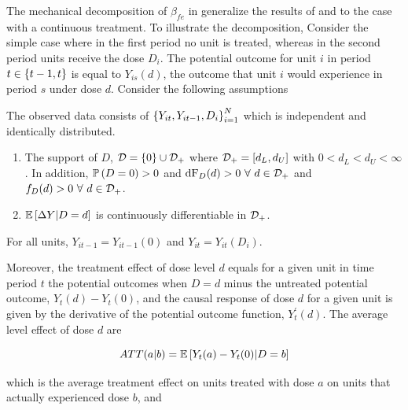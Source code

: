 \documentclass[11pt]{article}
\begin{document}
The mechanical decomposition of $\beta_{fe}$ in \citet{bib:callaway2021} generalize the results of \citet{bib:goodman-bacon2021} and \citet{bib:dechaisemartin2020} to the case with a continuous treatment. To illustrate the decomposition, Consider the simple case where in the first period no unit is treated, whereas in the second period units receive the dose $D_{i}$. The potential outcome for unit $i$ in period $t \in \left\{ t-1, t \right\}$ is equal to $Y_{is}(d)$, the outcome that unit $i$ would experience in period $s$ under dose $d$. Consider the following assumptions
\begin{assumption}\label{ass:rsamp}
    The observed data consists of $\left\{ Y_{it}, Y_{it-1}, D_{i} \right\}_{i=1}^{N}$ which is independent and identically distributed.
\end{assumption}
\begin{assumption}\label{ass:support}
    \begin{enumerate}
        \item The support of $D$, $\mathcal{D} = \left\{ 0 \right\} \cup \mathcal{D}_{+}$ where $\mathcal{D}_{+} = \left[ d_{L}, d_{U} \right]$ with $0 < d_{L} < d_{U} < \infty$. In addition, $\mathbb{P}\left( D = 0 \right) > 0$ and $\text{dF}_{D}(d) > 0 \ \forall \ d \in \mathcal{D}_{+}$ and $f_{D}(d) > 0 \ \forall \ d \in \mathcal{D}_{+}$.
        \item $\mathbb{E} \left[ \Delta Y | D = d \right]$ is continuously differentiable in $\mathcal{D}_{+}$.
    \end{enumerate}
\end{assumption}
\begin{assumption}\label{ass:noanti}
    For all units, $Y_{it-1} = Y_{it-1}(0)$ and $Y_{it} = Y_{it}(D_{i})$.
\end{assumption}

Moreover, the treatment effect of dose level $d$ equals for a given unit in time period $t$ the potential outcomes when $D = d$ minus the untreated potential outcome, $Y_t (d) - Y_t (0)$, and the causal response of dose $d$ for a given unit is given by the derivative of the potential outcome function, $Y^{\prime}_{t}(d)$. The average level effect of dose $d$ are

\begin{equation}
    ATT(a|b) = \mathbb{E} \left[ Y_t (a)  - Y_t (0) | D = b \right]
\end{equation}

which is the average treatment effect on units treated with dose $a$ on units that actually experienced dose $b$, and
\end{document}
